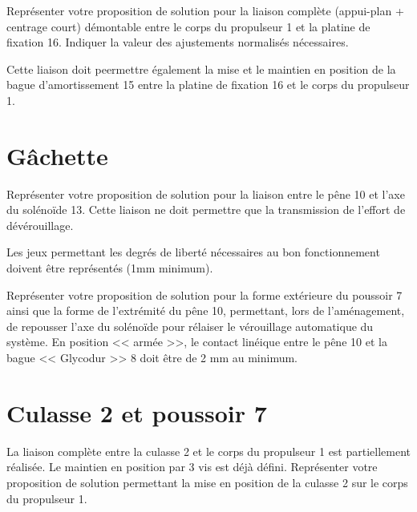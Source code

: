\documentclass[11pt]{article}
\begin{document}
\UPSTIquestion Représenter votre proposition de solution pour la liaison complète (appui-plan + centrage court) démontable entre le corps du propulseur 1 et la platine de fixation 16. Indiquer la valeur des ajustements normalisés nécessaires.

Cette liaison doit peermettre également la mise et le maintien en position de la bague d'amortissement 15 entre la platine de fixation 16 et le corps du propulseur 1. 

\begin{UPSTIcorrige}
\end{UPSTIcorrige}

\section{Gâchette}

\UPSTIquestion* Représenter votre proposition de solution pour la liaison entre le pêne 10 et l'axe du solénoïde 13. Cette liaison ne doit permettre que la transmission de l'effort de dévérouillage. 

Les jeux permettant les degrés de liberté nécessaires au bon fonctionnement doivent être représentés (1mm minimum). 
\begin{UPSTIcorrige}
\end{UPSTIcorrige}

\UPSTIquestion Représenter votre proposition de solution pour la forme extérieure du poussoir 7 ainsi que la forme de l'extrémité du pêne 10, permettant, lors de l'aménagement, de repousser l'axe du solénoïde pour rélaiser le vérouillage automatique du système. En position << armée >>, le contact linéique entre le pêne 10 et la bague << Glycodur >> 8 doit être de 2 mm au minimum.
\begin{UPSTIcorrige}
\end{UPSTIcorrige}

\section{Culasse 2 et poussoir 7}

\UPSTIquestion* La liaison complète entre la culasse 2 et le corps du propulseur 1 est partiellement réalisée. Le maintien en position par 3 vis est déjà défini. Représenter votre proposition de solution permettant la mise en position de la culasse 2 sur le corps du propulseur 1. 
\begin{UPSTIcorrige}
\end{UPSTIcorrige}
\end{document}
